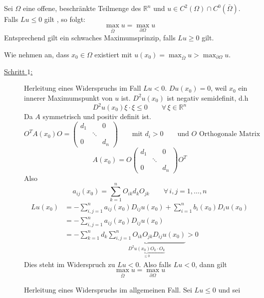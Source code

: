 \begin{satz}
	Sei $\Omega$ eine offene, beschränkte Teilmenge des $\mathbb{R}^n$ und $u \in C^2(\Omega) \cap C^0(\bar{\Omega})$. Falls $Lu \leq 0$ gilt , so folgt:
	\begin{equation}
		\max_{\bar \Omega}u = \max_{ \partial \Omega}u
	\end{equation}
	Entsprechend gilt ein schwaches Maximumsprinzip, falls $Lu \geq 0$ gilt.
\end{satz}
\begin{beweis}
	Wie nehmen an, dass $x_0 \in \Omega$ existiert mit $u(x_0)= \max_{\bar{\Omega}}u > \max_{ \partial \Omega}u$.
	\begin{description}
		\item[\underline{Schritt $1$:}]Herleitung eines Widerspruchs im Fall $Lu < 0$. $Du(x_0)=0$, weil $x_0$ ein innerer Maximumspunkt von $u$ ist. $D^2u(x_0)$ ist negativ semidefinit, d.h 
		\begin{equation}
			D^2u(x_0) \xi \cdot \xi \leq 0 \qquad \forall\, \xi \in \mathbb{R}^n
		\end{equation}  
		Da $A$ symmetrisch und positiv definit ist. 
		\[
			O^T A(x_0) O = \begin{pmatrix}
				d_1 & & 0 \\ & \ddots & \\ 0 & & d_n
			\end{pmatrix} \qquad \text{mit } d_i > 0 \qquad \text{und } O \text{ Orthogonale Matrix}
		\]
		\[
			A(x_0)= O \begin{pmatrix}
				d_1 & & 0 \\ & \ddots & \\ 0 & & d_n
			\end{pmatrix} O^T
		\]
		Also
		\[
			a_{ij}(x_0) = \sum^{n}_{k=1}O_{ik}d_kO_{jk} \qquad \forall\, i,j=1,\dots,n
		\]
		\begin{align*}
			Lu(x_0) &= - \sum^{n}_{i,j=1} a_{ij}(x_0) D_{ij}u(x_0) + \sum^{n}_{i=1}b_i(x_0)D_iu(x_0)  \\
			&= - \sum^{n}_{i,j=1} a_{ij}(x_0)D_{ij}u(x_0) \\
			&= - \sum_{k=1}^{n} d_k \underset{\underset{\leq 0}{\underbrace{D^2u(x_0)O_k \cdot O_k}}}{\underbrace{\sum^{n}_{i,j=1} O_{ik}O_{jk} D_{ij}u(x_0)}} > 0 
		\end{align*}
		Dies steht im Widerspruch zu $Lu < 0$. Also falls $Lu < 0$, dann gilt
		\[
			\max_{\bar{\Omega}}u = \max_{ \partial \Omega}u
		\]
		\item[] Herleitung eines Widerspruchs im allgemeinen Fall. Sei $Lu \leq 0$ und sei 

\end{description}
\end{beweis}
